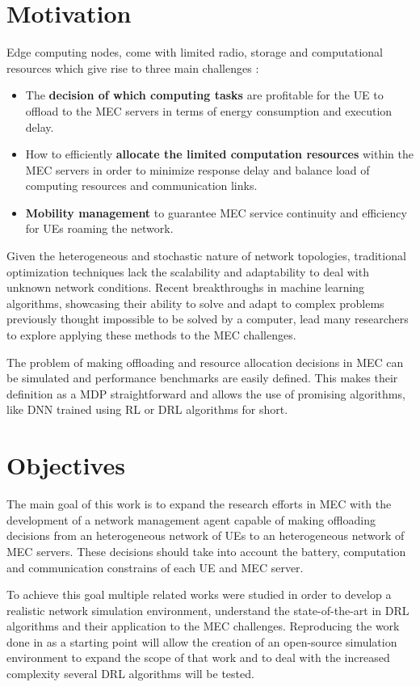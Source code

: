 \clearpage

\section{Motivation}
\noindent Edge computing nodes, come with limited radio, storage and computational resources which give rise to three main challenges \cite{SHAKARAMI2020107496}:
\begin{itemize}
    \item The \textbf{decision of which computing tasks} are profitable for the \acrshort{UE} to offload to the \acrshort{MEC} servers in terms of energy consumption and execution delay.
    \item How to efficiently \textbf{allocate the limited computation resources} within the \acrshort{MEC} servers in order to minimize response delay and balance load of computing resources and communication links.
    \item \textbf{Mobility management} to guarantee \acrshort{MEC} service continuity and efficiency for \acrshort{UE}s roaming the network.
\end{itemize}

Given the heterogeneous and stochastic nature of network topologies, traditional optimization techniques lack the scalability and adaptability to deal with unknown network conditions. Recent breakthroughs in machine learning algorithms, showcasing their ability to solve and adapt to complex problems previously thought impossible to be solved by a computer, lead many researchers to explore applying these methods to the \acrshort{MEC} challenges.
\par
The problem of making offloading and resource allocation decisions in \acrshort{MEC} can be simulated and performance benchmarks are easily defined. This makes their definition as a \acrfull{MDP} straightforward and allows the use of promising algorithms, like \acrfull{DNN} trained using \acrfull{RL} or \acrfull{DRL} algorithms for short. 

\section{Objectives}
\noindent The main goal of this work is to expand the research efforts in \acrshort{MEC} with the development of a network management agent capable of making offloading decisions from an heterogeneous network of \acrshort{UE}s to an heterogeneous network of \acrshort{MEC} servers. These decisions should take into account the battery, computation and communication constrains of each \acrshort{UE} and \acrshort{MEC} server.
\par
To achieve this goal multiple related works were studied in order to develop a realistic network simulation environment, understand the state-of-the-art in \acrshort{DRL} algorithms and their application to the \acrshort{MEC} challenges. Reproducing the work done in \cite{NUE1mec} as a starting point will allow the creation of an open-source simulation environment to expand the scope of that work and to deal with the increased complexity several \acrshort{DRL} algorithms will be tested.

